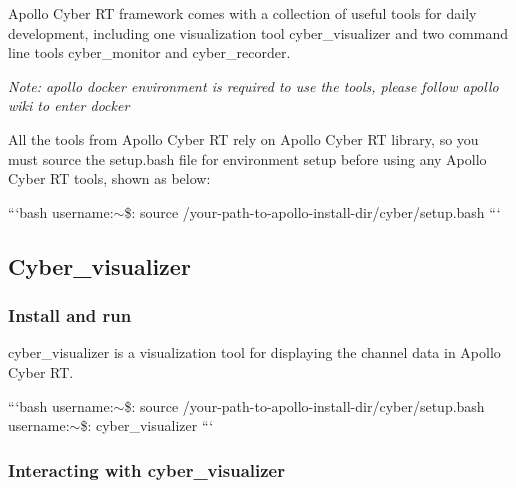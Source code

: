 Apollo Cyber R\-T framework comes with a collection of useful tools for daily development, including one visualization tool cyber\-\_\-visualizer and two command line tools cyber\-\_\-monitor and cyber\-\_\-recorder.

{\itshape Note\-: apollo docker environment is required to use the tools, please follow apollo wiki to enter docker}

All the tools from Apollo Cyber R\-T rely on Apollo Cyber R\-T library, so you must source the setup.\-bash file for environment setup before using any Apollo Cyber R\-T tools, shown as below\-:

```bash username\-:$\sim$\$\-: source /your-\/path-\/to-\/apollo-\/install-\/dir/cyber/setup.bash ```

\subsection*{Cyber\-\_\-visualizer}

\subsubsection*{Install and run}

{\ttfamily cyber\-\_\-visualizer} is a visualization tool for displaying the channel data in Apollo Cyber R\-T.

```bash username\-:$\sim$\$\-: source /your-\/path-\/to-\/apollo-\/install-\/dir/cyber/setup.bash username\-:$\sim$\$\-: cyber\-\_\-visualizer ```

\subsubsection*{Interacting with cyber\-\_\-visualizer}


